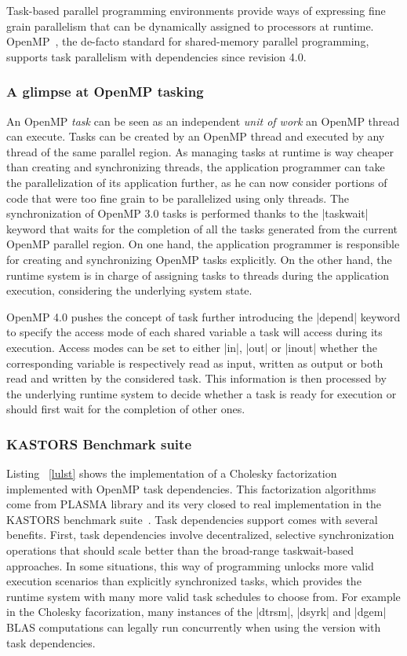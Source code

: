 \documentclass{Styles/llncs}
\begin{document}
Task-based parallel programming environments provide ways of expressing fine grain parallelism that can be dynamically assigned to processors at runtime.
OpenMP~\cite{openmp40}, the de-facto standard for shared-memory parallel programming, supports task parallelism with dependencies since revision 4.0.

\subsubsection{A glimpse at OpenMP tasking}

An OpenMP \emph{task} can be seen as an independent \emph{unit of work} an OpenMP thread can execute.
Tasks can be created by an OpenMP thread and executed by any thread of the same parallel region. 
As managing tasks at runtime is way cheaper than creating and synchronizing threads, the application programmer can take the parallelization of its application further, as he can now consider portions of code that were too fine grain to be parallelized using only threads.
The synchronization of OpenMP 3.0 tasks is performed thanks to the |taskwait| keyword that waits for the completion of all the tasks generated from the current OpenMP parallel region.
On one hand, the application programmer is responsible for creating and synchronizing OpenMP tasks explicitly. 
On the other hand, the runtime system is in charge of assigning tasks to threads during the application execution, considering the underlying system state.

OpenMP 4.0 pushes the concept of task further introducing the |depend| keyword to specify the access mode of each shared variable a task will access during its execution. 
Access modes can be set to either |in|, |out| or |inout| whether the corresponding variable is respectively read as input, written as output or both read and written by the considered task. 
This information is then processed by the underlying runtime system to decide whether a task is ready for execution or should first wait for the completion of other ones.

\subsubsection{KASTORS Benchmark suite}
Listing ~\ref{lulst} shows the implementation of a Cholesky factorization 
implemented with OpenMP task dependencies. 
This factorization algorithms come from PLASMA library and its very closed to real implementation in the KASTORS benchmark suite~\cite{virouleau:hal-01081974}.
Task dependencies support comes with several benefits. First, task
dependencies involve decentralized, selective synchronization operations
that should scale better than the broad-range taskwait-based approaches.
In some situations, this way of programming unlocks more valid execution
scenarios than explicitly synchronized tasks, which provides the runtime
system with many more valid task schedules to choose from. For example in the Cholesky facorization,
many instances of  the |dtrsm|, |dsyrk| and |dgem| BLAS computations can legally
run concurrently when using the version with task dependencies.
\end{document}

